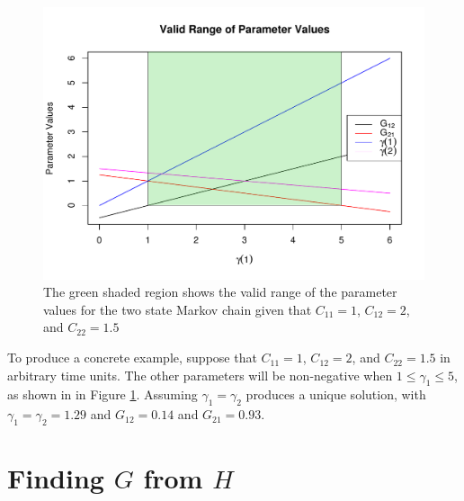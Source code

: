\documentclass{article}
\begin{document}
\begin{figure}
\centering
         \includegraphics[scale=.7]{figs/valid_range}
    \caption{The green shaded region shows 
        the valid range of the parameter values
        for the two state Markov chain given that
        $C_{11}=1$, $C_{12}=2$, and $C_{22}=1.5$}
    \label{fig:valid_range}
\end{figure}

To produce a concrete example, suppose that
$C_{11} = 1$, $C_{12} = 2$, and $C_{22} = 1.5$ in arbitrary time units.
The other parameters will be non-negative 
when $1 \leq \gamma_1 \leq 5$,
as shown in in Figure \ref{fig:valid_range}.
Assuming $\gamma_1 = \gamma_2$ produces a unique solution, 
with $\gamma_1 = \gamma_2 = 1.29$ and $G_{12} = 0.14$ and $G_{21} = 0.93$.



\section{Finding $G$ from $H$}
\label{apx::hitting_calcs}
\end{document}
